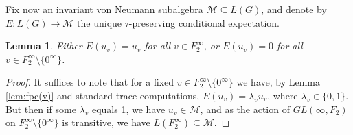 \documentclass[11pt]{amsart}
\theoremstyle{plain}
\newtheorem{lemma}[theorem]{Lemma}
\theoremstyle{definition}
\theoremstyle{remark}
\numberwithin{equation}{section}
\begin{document}
Fix now an invariant von Neumann subalgebra $\mathcal{M}\subseteq L(G)$, and denote by $E:L(G) \to \mathcal{M}$ the unique $\tau$-preserving conditional expectation.


\begin{lemma}\label{cor: E(v)=0 or v}
Either $E(u_v)=u_v$ for all $v\in F_2^\infty$, or $E(u_v)=0$ for all $v\in F_2^\infty\setminus \{0^\infty\}$.
\end{lemma}
\begin{proof}
	It suffices to note that for a fixed $v \in F_2^\infty \setminus \{0^\infty\}$ we have, by Lemma \ref{lem:fpc(v)} and standard trace computations, $E(u_v)=\lambda_v u_v$, where $\lambda_v \in \{0,1\}$. But then if some $\lambda_v$ equals 1, we have $u_v \in \mathcal M$, and as the action of $GL(\infty, F_2)$ on $F_2^\infty \setminus \{0^\infty\}$ is transitive, we have $L(F_2^\infty) \subseteq \mathcal M$.    
\end{proof}
\end{document}

